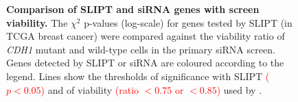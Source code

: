 \begin{figure}[!htbp]
\begin{center}
   \end{center}
   \caption[Comparison of SLIPT and siRNA genes with screen viability]{\small \textbf{Comparison of \gls{SLIPT} and \gls{siRNA} genes with screen viability.} The $\chi^2$ p-values (log-scale) for genes tested by \gls{SLIPT} (in \gls{TCGA} breast cancer) were compared against the viability ratio of \textit{CDH1} \gls{mutant} and \gls{wild-type} cells in the primary \gls{siRNA} screen. Genes detected by \gls{SLIPT} or \gls{siRNA} are coloured according to the legend. Lines show the thresholds of significance with \gls{SLIPT} \textcolor{red}{($p<0.05$)} and of viability \textcolor{red}{(ratio $<0.75$ or $<0.85$)} used by \citet{Telford2015}. %
}
\label{fig:compare_points_viability_SL}


\end{figure}
